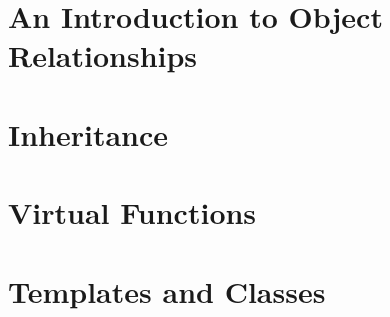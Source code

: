 \documentclass[UTF8]{ctexart}
\begin{document}
\newpage

\section{An Introduction to Object Relationships}








\newpage

\section{Inheritance}










\newpage

\section{Virtual Functions}













\newpage

\section{Templates and Classes}







\end{document}
